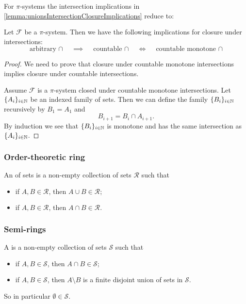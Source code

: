 For $\pi$-systems the intersection implications in \ref{lemma:unionsIntersectionClosureImplications} reduce to:
\begin{lemma} \label{lemma:unionsIntersectionClosureImplications}
Let $\mathcal{F}$ be a $\pi$-system. Then we have the following implications for closure under intersections:
\[ \text{arbitrary $\cap$} \quad\implies\quad \text{countable $\cap$} \quad\iff\quad \text{countable monotone $\cap$} \]
\end{lemma}
\begin{proof}
We need to prove that closure under countable monotone intersections implies closure under countable intersections.

Assume $\mathcal{F}$ is a $\pi$-system closed under countable monotone intersections. Let $\{A_i\}_{i\in \mathbb{N}}$ be an indexed family of sets. Then we can define the family $\{B_i\}_{i\in \mathbb{N}}$ recursively by $B_1 = A_1$ and
\[ B_{i+1} = B_i \cap A_{i+1}. \]
By induction we see that $\{B_i\}_{i\in \mathbb{N}}$ is monotone and has the same intersection as $\{A_i\}_{i\in \mathbb{N}}$.
\end{proof}

\subsubsection{Order-theoretic ring}
\begin{definition}
An  of sets is a non-empty collection of sets $\mathcal{R}$ such that
\begin{itemize}
\item if $A,B\in \mathcal{R}$, then $A\cup B\in \mathcal{R}$;
\item if $A,B\in \mathcal{R}$, then $A\cap B\in \mathcal{R}$.
\end{itemize}
\end{definition}

\subsubsection{Semi-rings}
\begin{definition}
A  is a non-empty collection of sets $\mathcal{S}$ such that
\begin{itemize}
\item if $A,B\in \mathcal{S}$, then $A\cap B\in \mathcal{S}$;
\item if $A,B\in \mathcal{S}$, then $A\setminus B$ is a finite disjoint union of sets in $\mathcal{S}$.
\end{itemize}
\end{definition}
So in particular $\emptyset\in\mathcal{S}$.

